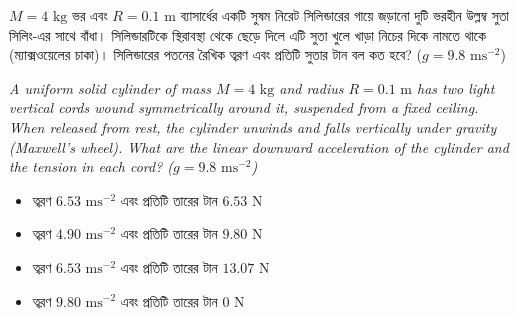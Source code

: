 \documentclass[12pt, a4paper]{article}
\begin{document}
\newpage

\begin{tcolorbox}[questionbox={প্রশ্ন (Question) 19}]
    \noindent
    $M = 4\text{ kg}$ ভর এবং $R = 0.1\text{ m}$ ব্যাসার্ধের একটি সুষম নিরেট সিলিন্ডারের গায়ে জড়ানো দুটি ভরহীন উল্লম্ব সুতা সিলিং-এর সাথে বাঁধা। সিলিন্ডারটিকে স্থিরাবস্থা থেকে ছেড়ে দিলে এটি সুতা খুলে খাড়া নিচের দিকে নামতে থাকে (ম্যাক্সওয়েলের চাকা)। সিলিন্ডারের পতনের রৈখিক ত্বরণ এবং প্রতিটি সুতার টান বল কত হবে? ($g = 9.8\text{ ms}^{-2}$)
    
    \vspace{0.8em}
    \begin{english}
    \noindent\textit{\color{darkgray}
    A uniform solid cylinder of mass $M = 4\text{ kg}$ and radius $R = 0.1\text{ m}$ has two light vertical cords wound symmetrically around it, suspended from a fixed ceiling. When released from rest, the cylinder unwinds and falls vertically under gravity (Maxwell's wheel). What are the linear downward acceleration of the cylinder and the tension in each cord? ($g = 9.8\text{ ms}^{-2}$)
    }
    \end{english}
\end{tcolorbox}

\vspace{1em}
\begin{center}
\end{center}
\vspace{1em}

\begin{itemize}[label={}, leftmargin=1cm, itemsep=0.5em]
    \item[\textbf{A)}] ত্বরণ $6.53\text{ ms}^{-2}$ এবং প্রতিটি তারের টান $6.53\text{ N}$
    \item[\textbf{B)}] ত্বরণ $4.90\text{ ms}^{-2}$ এবং প্রতিটি তারের টান $9.80\text{ N}$
    \item[\textbf{C)}] ত্বরণ $6.53\text{ ms}^{-2}$ এবং প্রতিটি তারের টান $13.07\text{ N}$
    \item[\textbf{D)}] ত্বরণ $9.80\text{ ms}^{-2}$ এবং প্রতিটি তারের টান $0\text{ N}$
\end{itemize}
\end{document}
